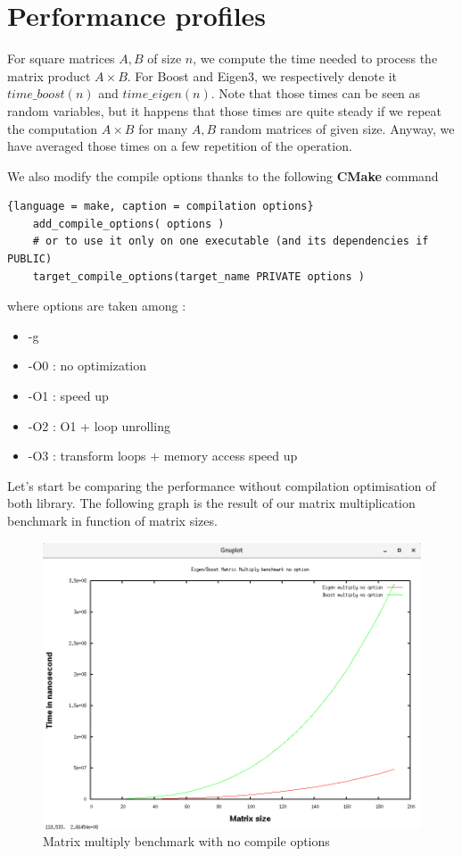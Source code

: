 \section{Performance profiles}
    For square matrices $A,B$ of size $n$, we compute the time needed to process the matrix product $A \times B$. For Boost and Eigen3, we respectively denote it $time\_boost(n)$  and $time\_eigen(n)$. 
    Note that those times can be seen as random variables, but it happens that those times are quite steady if we repeat the computation $A \times B$ for many $A,B$ random matrices of given size. Anyway, we have averaged those times on a few repetition of the operation.
    
    We also modify the compile options thanks to the following \textbf{CMake} command
    \begin{lstlisting}{language = make, caption = compilation options}
    add_compile_options( options )
    # or to use it only on one executable (and its dependencies if PUBLIC)
    target_compile_options(target_name PRIVATE options )
    \end{lstlisting}
    where options are taken among :
    
    \begin{itemize}
        \item -g 
        \item -O0 : no optimization
        \item -O1 : speed up
        \item -O2 : O1 + loop unrolling
        \item -O3 : transform loops + memory access speed up
    \end{itemize}
    Let's start be comparing the performance without compilation optimisation of both library.
    The following graph is the result of our matrix multiplication benchmark in function of matrix sizes.
    \newline
    \hspace{2cm}
    
    
    \begin{figure}[h]
        \includegraphics[width=\linewidth]{benchmark_multiply.png}
        \caption{Matrix multiply benchmark with no compile options }
        \label{Matrix multiply benchmark}
    \end{figure}

